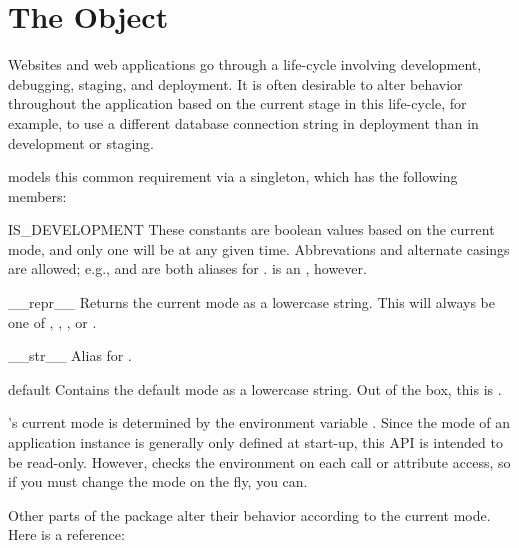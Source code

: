 \section{The  Object \label{mode}}

Websites and web applications go through a life-cycle involving development,
debugging, staging, and deployment. It is often desirable to alter behavior
throughout the application based on the current stage in this life-cycle, for
example, to use a different database connection string in deployment than in
development or staging.

 models this common requirement via a  singleton,
which has the following members:

\begin{memberdesc}[boolean]{IS_DEVELOPMENT}
    These constants are boolean values based on the current mode, and only one
    will be  at any given time. Abbrevations and alternate casings
    are allowed; e.g.,  and  are both
    aliases for .  is an
    , however.
\end{memberdesc}

\begin{methoddesc}{__repr__}{}
    Returns the current mode as a lowercase string. This will always be one of
    , , , or .
\end{methoddesc}

\begin{methoddesc}{__str__}{}
    Alias for .
\end{methoddesc}

\begin{memberdesc}{default}
    Contains the default mode as a lowercase string. Out of the box, this is
    .
\end{memberdesc}


's current mode is determined by the environment variable
. Since the mode of an application instance is generally only
defined at start-up, this API is intended to be read-only. However, 
checks the environment on each call or attribute access, so if you must change
the mode on the fly, you can.

Other parts of the  package alter their behavior according to the
current mode. Here is a reference:

